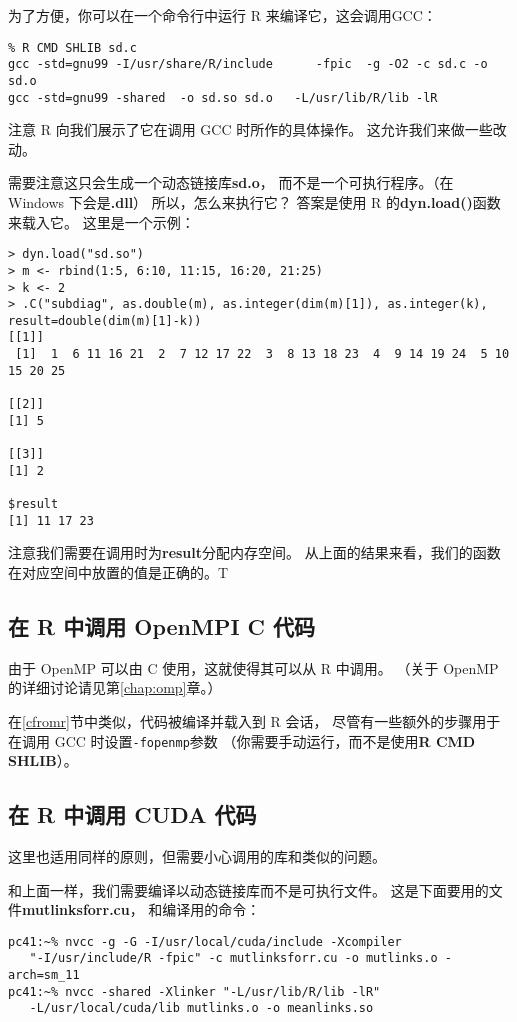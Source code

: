 为了方便，你可以在一个命令行中运行 R 来编译它，这会调用GCC：

\begin{lstlisting}
% R CMD SHLIB sd.c
gcc -std=gnu99 -I/usr/share/R/include      -fpic  -g -O2 -c sd.c -o sd.o
gcc -std=gnu99 -shared  -o sd.so sd.o   -L/usr/lib/R/lib -lR
\end{lstlisting}

注意 R 向我们展示了它在调用 GCC 时所作的具体操作。
这允许我们来做一些改动。

需要注意这只会生成一个动态链接库{\bf sd.o}，
而不是一个可执行程序。（在 Windows 下会是{\bf .dll}）
所以，怎么来执行它？
答案是使用 R 的{\bf dyn.load()}函数来载入它。
这里是一个示例：

\begin{lstlisting}
> dyn.load("sd.so")
> m <- rbind(1:5, 6:10, 11:15, 16:20, 21:25)
> k <- 2
> .C("subdiag", as.double(m), as.integer(dim(m)[1]), as.integer(k),
result=double(dim(m)[1]-k))
[[1]]
 [1]  1  6 11 16 21  2  7 12 17 22  3  8 13 18 23  4  9 14 19 24  5 10 15 20 25

[[2]]
[1] 5

[[3]]
[1] 2

$result
[1] 11 17 23
\end{lstlisting}

注意我们需要在调用时为{\bf result}分配内存空间。
从上面的结果来看，我们的函数在对应空间中放置的值是正确的。T

\subsection{在 R 中调用 OpenMPI C 代码}

由于 OpenMP 可以由 C 使用，这就使得其可以从 R 中调用。
（关于 OpenMP 的详细讨论请见第\ref{chap:omp}章。）

在\ref{cfromr}节中类似，代码被编译并载入到 R 会话，
尽管有一些额外的步骤用于在调用 GCC 时设置{\tt -fopenmp}参数
（你需要手动运行，而不是使用{\bf R CMD SHLIB}）。

\subsection{在 R 中调用 CUDA 代码}

这里也适用同样的原则，但需要小心调用的库和类似的问题。

和上面一样，我们需要编译以动态链接库而不是可执行文件。
这是下面要用的文件{\bf mutlinksforr.cu}，
和编译用的命令：

\begin{lstlisting}
pc41:~% nvcc -g -G -I/usr/local/cuda/include -Xcompiler
   "-I/usr/include/R -fpic" -c mutlinksforr.cu -o mutlinks.o -arch=sm_11
pc41:~% nvcc -shared -Xlinker "-L/usr/lib/R/lib -lR"
   -L/usr/local/cuda/lib mutlinks.o -o meanlinks.so
\end{lstlisting}

